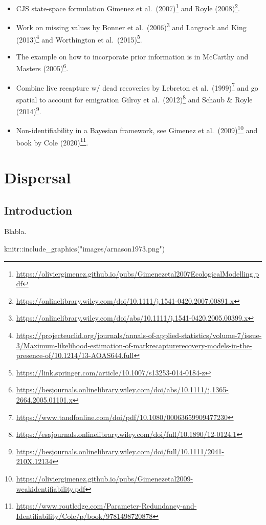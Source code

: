 \documentclass[
  12pt,
]{krantz}
\newenvironment{Shaded}{\begin{snugshade}}{\end{snugshade}}
\newcommand{\FunctionTok}[1]{\textcolor[rgb]{0.00,0.00,0.00}{#1}}
\newcommand{\NormalTok}[1]{#1}
\newcommand{\SpecialCharTok}[1]{\textcolor[rgb]{0.00,0.00,0.00}{#1}}
\newcommand{\StringTok}[1]{\textcolor[rgb]{0.31,0.60,0.02}{#1}}
\renewcommand{\href}[2]{#2\footnote{\url{#1}}}
\begin{document}
\begin{itemize}
\item
  CJS state-space formulation \href{https://oliviergimenez.github.io/pubs/Gimenezetal2007EcologicalModelling.pdf}{Gimenez et al.~(2007)} and \href{https://onlinelibrary.wiley.com/doi/10.1111/j.1541-0420.2007.00891.x}{Royle (2008)}.
\item
  Work on missing values by \href{https://onlinelibrary.wiley.com/doi/abs/10.1111/j.1541-0420.2005.00399.x}{Bonner et al.~(2006)} and \href{https://projecteuclid.org/journals/annals-of-applied-statistics/volume-7/issue-3/Maximum-likelihood-estimation-of-markrecapturerecovery-models-in-the-presence-of/10.1214/13-AOAS644.full}{Langrock and King (2013)} and \href{https://link.springer.com/article/10.1007/s13253-014-0184-z}{Worthington et al.~(2015)}.
\item
  The example on how to incorporate prior information is in \href{https://besjournals.onlinelibrary.wiley.com/doi/abs/10.1111/j.1365-2664.2005.01101.x}{McCarthy and Masters (2005)}.
\item
  Combine live recapture w/ dead recoveries by \href{https://www.tandfonline.com/doi/pdf/10.1080/00063659909477230}{Lebreton et al.~(1999)} and go spatial to account for emigration \href{https://esajournals.onlinelibrary.wiley.com/doi/full/10.1890/12-0124.1}{Gilroy et al.~(2012)} and \href{https://besjournals.onlinelibrary.wiley.com/doi/full/10.1111/2041-210X.12134}{Schaub \& Royle (2014)}.
\item
  Non-identifiability in a Bayesian framework, see \href{https://oliviergimenez.github.io/pubs/Gimenezetal2009-weakidentifiability.pdf}{Gimenez et al.~(2009)} and \href{https://www.routledge.com/Parameter-Redundancy-and-Identifiability/Cole/p/book/9781498720878}{book by Cole (2020)}.
\end{itemize}

\hypertarget{dispersal}{%
\chapter{Dispersal}\label{dispersal}}

\hypertarget{introduction-6}{%
\section{Introduction}\label{introduction-6}}

Blabla.

\begin{Shaded}
\begin{Highlighting}[]
\NormalTok{knitr}\SpecialCharTok{::}\FunctionTok{include\_graphics}\NormalTok{(}\StringTok{"images/arnason1973.png"}\NormalTok{)}
\end{Highlighting}
\end{Shaded}
\end{document}
